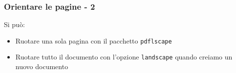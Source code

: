 \begin{frame}
 \frametitle{Orientare le pagine - 2}
 
 Si può:
 \begin{itemize}
  \item<1-> Ruotare una sola pagina con il pacchetto \texttt{pdflscape}
  \item<2-> Ruotare tutto il documento con l'opzione \texttt{landscape} quando 
creiamo un nuovo documento
 \end{itemize}

 
 
\end{frame}
